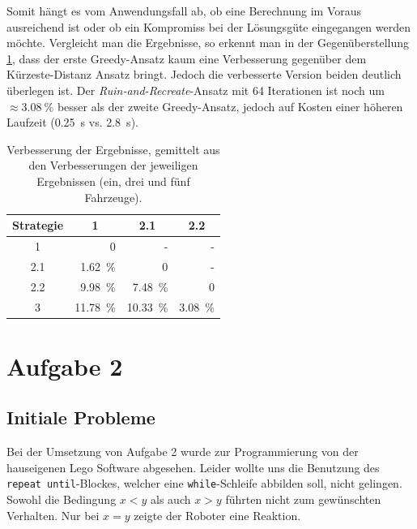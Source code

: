 \documentclass[ngerman]{tudscrreprt}
\newcommand{\code}[1]{\texttt{#1}}
\begin{document}
Somit hängt es vom Anwendungsfall ab, ob eine Berechnung im Voraus ausreichend ist oder
ob ein Kompromiss bei der Lösungsgüte eingegangen werden möchte.
Vergleicht man die Ergebnisse, so erkennt man in der Gegenüberstellung
\ref{table:compare-strategies}, dass der erste Greedy-Ansatz kaum eine Verbesserung
gegenüber dem Kürzeste-Distanz Ansatz bringt.
Jedoch die verbesserte Version beiden deutlich überlegen ist.
Der \emph{Ruin-and-Recreate}-Ansatz mit 64 Iterationen ist noch um $\approx \SI{3.08}{\percent}$ besser als
der zweite Greedy-Ansatz, jedoch auf Kosten einer höheren
Laufzeit (\SI{0.25}{\s} vs. \SI{2.8}{\s}).

\begin{table}[H]
    \centering
    \begin{tabular}{|c|r|r|r|}
    \hline\centering
    Strategie & \multicolumn{1}{c|}{1} & \multicolumn{1}{c|}{2.1} & \multicolumn{1}{c|}{2.2}
                                                                                        \\ \hline
    1         & 0                      & -                        & -                   \\ \hline
    2.1       & \SI{ 1.62}{\percent}   & 0                        & -                   \\ \hline
    2.2       & \SI{ 9.98}{\percent}   & \SI{ 7.48}{\percent}     & 0                   \\ \hline
    3         & \SI{11.78}{\percent}   & \SI{10.33}{\percent}     & \SI{3.08}{\percent} \\ \hline
    \end{tabular}
    \caption{Verbesserung der Ergebnisse, gemittelt aus den Verbesserungen der jeweiligen
    Ergebnissen (ein, drei und fünf Fahrzeuge).}
    \label{table:compare-strategies}
\end{table}

\chapter{Aufgabe 2}
\section{Initiale Probleme}
Bei der Umsetzung von Aufgabe 2 wurde zur Programmierung von der hauseigenen Lego Software
abgesehen. Leider wollte uns die Benutzung des \code{repeat until}-Blockes, welcher eine
\code{while}-Schleife abbilden soll, nicht gelingen. Sowohl die Bedingung $x < y$ als auch
$x > y$ führten nicht zum gewünschten Verhalten. Nur bei $x = y$ zeigte der Roboter eine
Reaktion.
\end{document}
